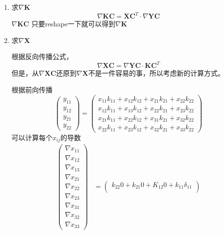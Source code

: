 \begin{enumerate}
	\item 求$\nabla \boldsymbol{K}$
	\begin{equation}
		\nabla \boldsymbol{KC} = \boldsymbol{XC}^T\cdot \nabla \boldsymbol{YC}
	\end{equation}
	$\nabla \boldsymbol{KC}$ 只要reshape一下就可以得到$\nabla \boldsymbol{K}$
	\item 求$\nabla \boldsymbol{X}$
	
	根据反向传播公式，
	\begin{equation}
		\nabla \boldsymbol{XC} = \nabla \boldsymbol{YC} \cdot \boldsymbol{KC}^T
	\end{equation}
	但是，从$\nabla \boldsymbol{XC}$还原到$\nabla \boldsymbol{X}$不是一件容易的事，所以考虑新的计算方式。
	
	根据前向传播
	\begin{equation}
		\begin{pmatrix}
		y_{11}\\ 
		y_{12}\\ 
		y_{21}\\ 
		y_{22}
		\end{pmatrix} = 
		\begin{pmatrix}
		x_{11}k_{11} +x_{12}k_{12} +x_{21}k_{21} +x_{22}k_{22} \\ 
		x_{12}k_{11} +x_{13}k_{12} +x_{22}k_{21} +x_{23}k_{22}\\
		x_{21}k_{11} +x_{22}k_{12} +x_{31}k_{21} +x_{32}k_{22}\\
		x_{22}k_{11} +x_{23}k_{12} +x_{32}k_{21} +x_{33}k_{22}
		\end{pmatrix}
	\end{equation}
	可以计算每个$x_{ij}$的导数
	\begin{equation}
		\begin{aligned}
		\begin{pmatrix}
		\nabla x_{11} \\ 
		\nabla x_{12}\\ 
		\nabla x_{13}\\ 
		\nabla x_{21}\\ 
		\nabla x_{22}\\ 
		\nabla x_{23}\\ 
		\nabla x_{31}\\ 
		\nabla x_{32}\\ 
		\nabla x_{33}
		\end{pmatrix} &= \begin{pmatrix}
			k_{22}0 + k_{21}0 + K_{12}0+k_{11}\delta_{11} \\

\end{pmatrix}
\end{aligned}
\end{equation}
\end{enumerate}
